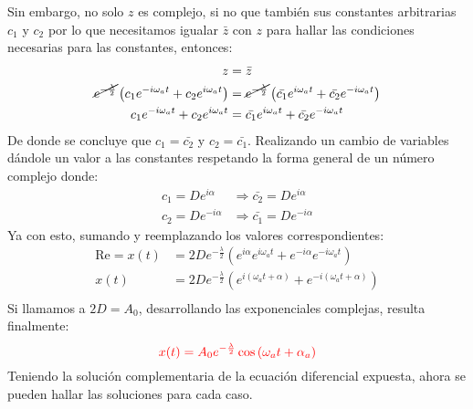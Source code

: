 \begin{multicols}{2}
Sin embargo, no solo $z$ es complejo, si no que también sus constantes arbitrarias $c_{1}$ y $c_{2}$ por lo que necesitamos igualar $\bar{z}$ con $z$ para hallar las condiciones necesarias para las constantes, entonces:
\begin{align*}
    z &= \bar{z}\\
    \cancel{e^{-\frac{\lambda}{2}}} \left(c_{1} e^{-i\omega_a t} + c_{2} e^{i\omega_a t}\right) &= \cancel{e^{-\frac{\lambda}{2}}} \left(\bar{c_{1}} e^{i\omega_a t} + \bar{c_{2}} e^{-i\omega_a t}\right)\\
    c_{1} e^{-i\omega_a t} + c_{2} e^{i\omega_a t} &= \bar{c_{1}} e^{i\omega_a t} + \bar{c_{2}} e^{-i\omega_a t}
\end{align*}
De donde se concluye que $c_{1} = \bar{c_{2}}$ y $c_{2} = \bar{c_{1}}$. Realizando un cambio de variables dándole un valor a las constantes respetando la forma general de un número complejo donde:
\begin{align*}
    c_{1} = D e^{i\alpha} &\Rightarrow \bar{c_{2}} = D e^{i\alpha}\\
    c_{2} = D e^{-i\alpha} &\Rightarrow \bar{c_{1}} = D e^{-i\alpha}
\end{align*}
Ya con esto, sumando y reemplazando los valores correspondientes:
\begin{align*}
    \mathrm{Re} = x(t) &= 2De^{-\frac{\lambda}{2}} \left(e^{i\alpha}e^{i\omega_at} + e^{-i\alpha}e^{-i\omega_at}\right)\\
    x(t) &= 2De^{-\frac{\lambda}{2}} \left(e^{i\left(\omega_at + \alpha\right)} + e^{-i\left(\omega_at + \alpha\right)}\right)\\
\end{align*}
Si llamamos a $2D = A_0$, desarrollando las exponenciales complejas, resulta finalmente:
\begin{equation}
    \textcolor{rojo}{x(t) = A_0e^{-\frac{\lambda}{2}} \cos\left(\omega_a t + \alpha_a\right)} \label{pro5:res3}
\end{equation}
Teniendo la solución complementaria de la ecuación diferencial expuesta, ahora se pueden hallar las soluciones para cada caso.


\end{multicols}
